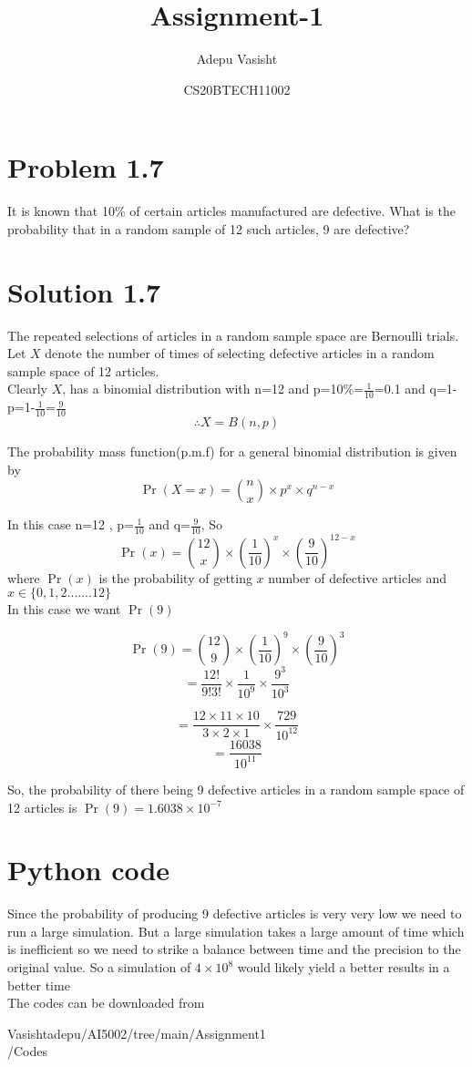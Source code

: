 \documentclass[journal,12pt,twocolumn]{IEEEtran}
\title{Assignment-1}
\author{Adepu Vasisht}
\date{CS20BTECH11002}
\begin{document}
\maketitle

\section*{Problem 1.7}
It is known that 10$\%$ of certain articles manufactured are defective. What is the probability that in a random sample of 12 such articles, 9 are defective?
\section*{Solution 1.7}
The repeated selections of articles in a random sample space are Bernoulli trials. Let $X$ denote the number of times of selecting defective articles in a random sample space of 12 articles.\\

Clearly $X$, has a binomial distribution with n=12 and p=10\%=$\frac{1}{10}$=0.1
and q=1-p=1-$\frac{1}{10}$=$\frac{9}{10}$\\

$$\therefore X = B (n,p)$$

The probability mass function(p.m.f) for a general binomial distribution is given by $$\Pr(X=x)= {n \choose x} \times p^x\times q^{n-x}$$

In this case n=12 , p=$\frac{1}{10}$ and q=$\frac{9}{10}$, So 
$$\Pr(x)={12 \choose x}\times(\frac{1}{10})^x\times(\frac{9}{10})^{12-x}$$
where $\Pr(x)$ is the probability of getting $x$ number of defective articles and $x\in \{0,1,2.......12\}$\\

In this case we want $\Pr(9)$ 
    

    
 $$\Pr(9)={12 \choose 9}\times(\frac{1}{10})^9\times(\frac{9}{10})^{3}$$
$$=\frac{12!}{9!3!}\times\frac{1}{10^9}\times\frac{9^3}{10^3}$$

$$=\frac{12\times11\times10}{3\times2\times1}\times\frac{729}{10^12}$$
$$=\frac{16038}{10^{11}}$$

So, the probability of there being 9 defective articles in a random sample space of 12 articles is $\Pr(9)=1.6038\times 10^{-7}$ 


\section*{Python code}
Since the probability of producing 9 defective articles is very very low we need to run a large simulation. But a large simulation takes a large amount of time which is inefficient so we need to strike a balance between time and the precision to the original value. So a simulation of $4\times10^8$ would likely yield a better results in a better time\\
The codes can be downloaded from

\begin{tcolorbox}{
Vasishtadepu/AI5002/tree/main/Assignment1\\/Codes
}
\end{tcolorbox}
\end{document}
